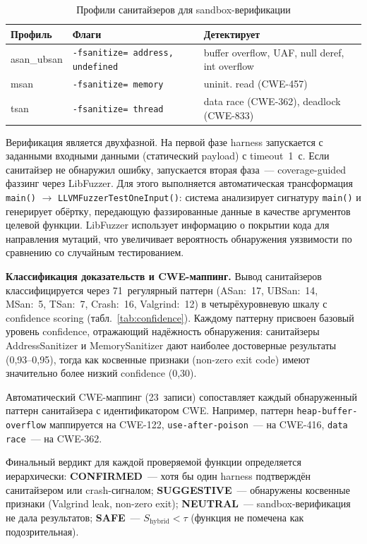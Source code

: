\documentclass[runningheads]{llncs}
\begin{document}
\begin{table}
\centering
\caption{Профили санитайзеров для sandbox-верификации}
\label{tab:sanitizers}
\small
\begin{tabular}{|l|p{3.2cm}|p{4.0cm}|}
\hline
\textbf{Профиль} & \textbf{Флаги} & \textbf{Детектирует} \\
\hline
asan\_ubsan & \texttt{-fsanitize= address, undefined} & buffer overflow, UAF, null deref, int overflow \\
msan & \texttt{-fsanitize= memory} & uninit. read (CWE-457) \\
tsan & \texttt{-fsanitize= thread} & data race (CWE-362), deadlock (CWE-833) \\
\hline
\end{tabular}
\end{table}

Верификация является двухфазной. На первой фазе harness запускается с заданными входными данными (статический payload) с timeout~1~с. Если санитайзер не обнаружил ошибку, запускается вторая фаза~--- coverage-guided фаззинг через LibFuzzer. Для этого выполняется автоматическая трансформация \texttt{main()} $\to$ \texttt{LLVMFuzzerTestOneInput()}: система анализирует сигнатуру \texttt{main()} и генерирует обёртку, передающую фаззированные данные в качестве аргументов целевой функции. LibFuzzer использует информацию о покрытии кода для направления мутаций, что увеличивает вероятность обнаружения уязвимости по сравнению со случайным тестированием.

\textbf{Классификация доказательств и CWE-маппинг.} Вывод санитайзеров классифицируется через 71~регулярный паттерн (ASan:~17, UBSan:~14, MSan:~5, TSan:~7, Crash:~16, Valgrind:~12) в четырёхуровневую шкалу с confidence scoring (табл.~\ref{tab:confidence}). Каждому паттерну присвоен базовый уровень confidence, отражающий надёжность обнаружения: санитайзеры AddressSanitizer и MemorySanitizer дают наиболее достоверные результаты (0,93--0,95), тогда как косвенные признаки (non-zero exit code) имеют значительно более низкий confidence (0,30).

Автоматический CWE-маппинг (23~записи) сопоставляет каждый обнаруженный паттерн санитайзера с идентификатором CWE. Например, паттерн \texttt{heap-buffer-overflow} маппируется на CWE-122, \texttt{use-after-poison}~--- на CWE-416, \texttt{data race}~--- на CWE-362.

Финальный вердикт для каждой проверяемой функции определяется иерархически: \textbf{CONFIRMED}~--- хотя бы один harness подтверждён санитайзером или crash-сигналом; \textbf{SUGGESTIVE}~--- обнаружены косвенные признаки (Valgrind leak, non-zero exit); \textbf{NEUTRAL}~--- sandbox-верификация не дала результатов; \textbf{SAFE}~--- $S_{\text{hybrid}} < \tau$ (функция не помечена как подозрительная).
\end{document}
